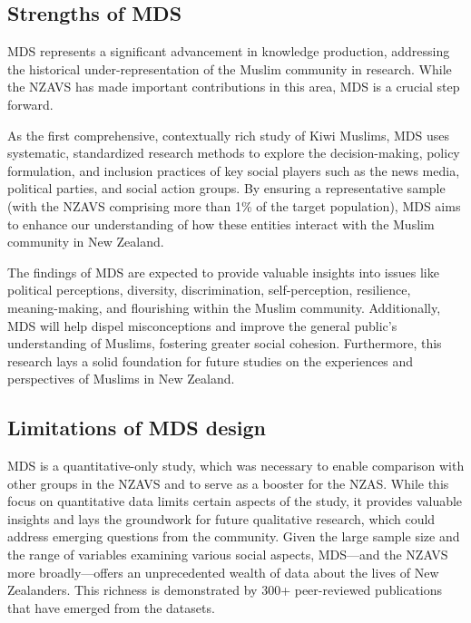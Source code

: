 \documentclass[
]{interact}
\begin{document}
\subsection{Strengths of MDS}\label{strengths-of-mds}

MDS represents a significant advancement in knowledge production,
addressing the historical under-representation of the Muslim community
in research. While the NZAVS has made important contributions in this
area, MDS is a crucial step forward.

As the first comprehensive, contextually rich study of Kiwi Muslims, MDS
uses systematic, standardized research methods to explore the
decision-making, policy formulation, and inclusion practices of key
social players such as the news media, political parties, and social
action groups. By ensuring a representative sample (with the NZAVS
comprising more than 1\% of the target population), MDS aims to enhance
our understanding of how these entities interact with the Muslim
community in New Zealand.

The findings of MDS are expected to provide valuable insights into
issues like political perceptions, diversity, discrimination,
self-perception, resilience, meaning-making, and flourishing within the
Muslim community. Additionally, MDS will help dispel misconceptions and
improve the general public's understanding of Muslims, fostering greater
social cohesion. Furthermore, this research lays a solid foundation for
future studies on the experiences and perspectives of Muslims in New
Zealand.

\subsection{Limitations of MDS design}\label{limitations-of-mds-design}

MDS is a quantitative-only study, which was necessary to enable
comparison with other groups in the NZAVS and to serve as a booster for
the NZAS. While this focus on quantitative data limits certain aspects
of the study, it provides valuable insights and lays the groundwork for
future qualitative research, which could address emerging questions from
the community. Given the large sample size and the range of variables
examining various social aspects, MDS---and the NZAVS more
broadly---offers an unprecedented wealth of data about the lives of New
Zealanders. This richness is demonstrated by 300+ peer-reviewed
publications that have emerged from the datasets.
\end{document}

